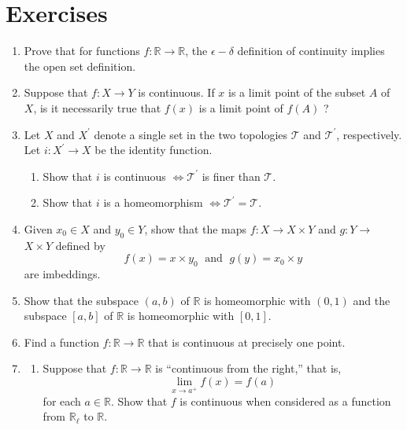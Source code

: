 \section*{Exercises}
\begin{enumerate}[itemsep=0.4em, parsep=0pt, topsep=0pt, partopsep=0pt, leftmargin=*, label=\arabic*., ref=\arabic*]
\item Prove that for functions \(f : \mathbb{R} \rightarrow \mathbb{R}\), the \(\epsilon - \delta\) definition of continuity implies the open set definition.
\item Suppose that \(f : X \rightarrow Y\) is continuous. If \(x\) is a limit point of the subset \(A\) of \(X\), is it necessarily true that \(f(x)\) is a limit point of \(f( A)\) ?
\item Let \(X\) and \(X^{\prime }\) denote a single set in the two topologies \(\mathcal{T}\) and \(\mathcal{T}^{\prime }\), respectively. Let \(i : X^{\prime } \rightarrow X\) be the identity function.
  \begin{enumerate}[itemsep=0.2em, parsep=0pt, topsep=0pt, partopsep=0pt, leftmargin=*, label=(\alph*), align=left]
  \item Show that \(i\) is continuous \(\Leftrightarrow {\mathcal{T}}^{\prime }\) is finer than \(\mathcal{T}\).
  \item Show that \(i\) is a homeomorphism \(\Leftrightarrow {\mathcal{T}}^{\prime } = \mathcal{T}\).
  \end{enumerate}
\item Given \(x_{0} \in X\) and \(y_{0} \in Y\), show that the maps \(f : X \rightarrow X \times Y\) and \(g : Y \rightarrow\) \(X \times Y\) defined by \[ f(x) = x \times {y}_{0}\;\text{ and }\;g( y) = x_{0} \times y \] are imbeddings.
\item Show that the subspace \((a, b)\) of \(\mathbb{R}\) is homeomorphic with \((0, 1)\) and the subspace \([ {a,b}]\) of \(\mathbb{R}\) is homeomorphic with \([ {0,1}]\).
\item Find a function \(f : \mathbb{R} \rightarrow \mathbb{R}\) that is continuous at precisely one point.
\item
  \begin{enumerate}[itemsep=0.2em, parsep=0pt, topsep=0pt, partopsep=0pt, leftmargin=*, label=(\alph*), align=left]
  \item Suppose that \(f : \mathbb{R} \rightarrow \mathbb{R}\) is ``continuous from the right,'' that is, \[ \mathop{\lim }\limits_{{x \rightarrow {a}^{ + }}}f(x) = f( a) \] for each \(a \in \mathbb{R}\). Show that \(f\) is continuous when considered as a function from \(\mathbb{R}_{\ell }\) to \(\mathbb{R}\).


\end{enumerate}
\end{enumerate}
